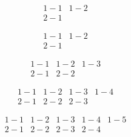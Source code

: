 \documentclass[oneside]{book}
\begin{document}
\pagestyle{empty}

%
%
%
%




\begin{align*}1-1&1-2\\2-1\end{align*} %

\begin{align*}1-1&1-2\\2-1&\end{align*} %

\begin{align*}1-1&1-2&1-3\\2-1&2-2&\end{align*}

\begin{align*}1-1&1-2&1-3&1-4\\2-1&2-2&2-3&\end{align*}

\begin{align*}1-1&1-2&1-3&1-4&1-5\\2-1&2-2&2-3&2-4&\end{align*}
\end{document}
